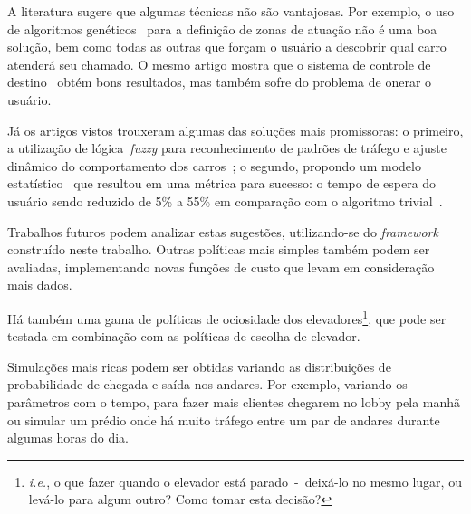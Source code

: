 A literatura sugere que algumas técnicas não são vantajosas. Por exemplo, o uso
de algoritmos genéticos~\cite{KOEHLEROTTIGER02} para a definição de zonas de
atuação não é uma boa solução, bem como todas as outras que forçam o usuário a
descobrir qual carro atenderá seu chamado. O mesmo artigo mostra que o sistema
de controle de destino~\cite{KOEHLEROTTIGER02} obtém bons resultados, mas também
sofre do problema de onerar o usuário.

Já os artigos vistos trouxeram algumas das soluções mais promissoras: o
primeiro, a utilização de lógica~\textit{fuzzy} para reconhecimento de padrões
de tráfego e ajuste dinâmico do comportamento dos carros~\cite{marja97}; o
segundo, propondo um modelo estatístico~\cite{DBLP:journals/corr/abs-1212-2499}
que resultou em uma métrica para sucesso: o tempo de espera do usuário sendo
reduzido de 5\% a 55\% em comparação com o algoritmo
trivial~\cite{DBLP:journals/corr/abs-1212-2499}.

Trabalhos futuros podem analizar estas sugestões, utilizando-se do
\textit{framework} construído neste trabalho. Outras políticas mais simples
também podem ser avaliadas, implementando novas funções de custo que levam em
consideração mais dados.

Há também uma gama de políticas de ociosidade dos
elevadores\footnote{\textit{i.e.}, o que fazer quando o elevador está
  parado~-~deixá-lo no mesmo lugar, ou levá-lo para algum outro? Como tomar esta
decisão?}, que pode ser testada em combinação com as políticas de escolha de elevador.

Simulações mais ricas podem ser obtidas variando as distribuições de
probabilidade de chegada e saída nos andares. Por exemplo, variando os
parâmetros com o tempo, para fazer mais clientes chegarem no lobby pela manhã ou
simular um prédio onde há muito tráfego entre um par de andares durante algumas
horas do dia.

